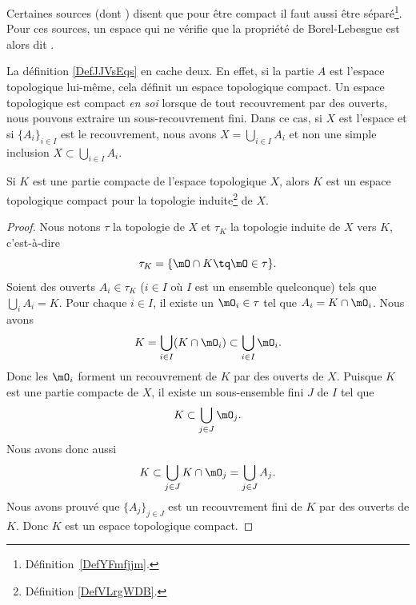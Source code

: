 \begin{remark}
	Certaines sources (dont ) disent que pour être compact il faut aussi être séparé\footnote{Définition~\ref{DefYFmfjjm}.}. Pour ces sources, un espace qui ne vérifie que la propriété de Borel-Lebesgue est alors dit .
\end{remark}

\begin{normaltext}
	La définition \ref{DefJJVsEqs} en cache deux. En effet, si la partie \( A\) est l'espace topologique lui-même, cela définit un espace topologique compact. Un espace topologique est compact \emph{en soi} lorsque de tout recouvrement par des ouverts, nous pouvons extraire un sous-recouvrement fini. Dans ce cas, si \( X\) est l'espace et si \( \{ A_i \}_{i\in I}\) est le recouvrement, nous avons \( X=\bigcup_{i\in I}A_i\) et non une simple inclusion \( X\subset \bigcup_{i\in I}A_i\).
\end{normaltext}

\begin{lemma}       \label{LEMooVYTRooKTIYdn}
	Si \( K\) est une partie compacte de l'espace topologique \( X\), alors \( K\) est un espace topologique compact pour la topologie induite\footnote{Définition \ref{DefVLrgWDB}.} de \( X\).
\end{lemma}

\begin{proof}
	Nous notons \( \tau\) la topologie de \( X\) et \( \tau_K\) la topologie induite de \( X\) vers \( K\), c'est-à-dire
	\begin{equation}
		\tau_K=\{ \mO\cap K\tq \mO\in\tau \}.
	\end{equation}
	Soient des ouverts \( A_i\in \tau_K\) (\( i\in I\) où \( I\) est un ensemble quelconque) tels que \( \bigcup_iA_i=K\). Pour chaque \( i\in I\), il existe un \( \mO_i\in \tau\) tel que \( A_i=K\cap\mO_i\). Nous avons
	\begin{equation}
		K=\bigcup_{i\in I}(K\cap\mO_i)\subset\bigcup_{i\in I}\mO_i.
	\end{equation}
	Donc les \( \mO_i\) forment un recouvrement de \( K\) par des ouverts de \( X\). Puisque \( K\) est une partie compacte de \( X\), il existe un sous-ensemble fini \( J\) de \( I\) tel que
	\begin{equation}
		K\subset\bigcup_{j\in J}\mO_j.
	\end{equation}
	Nous avons donc aussi
	\begin{equation}
		K\subset\bigcup_{j\in J}K\cap\mO_j=\bigcup_{j\in J}A_j.
	\end{equation}
	Nous avons prouvé que \( \{ A_j \}_{j\in J}\) est un recouvrement fini de \( K\) par des ouverts de \( K\). Donc \( K\) est un espace topologique compact.
\end{proof}


